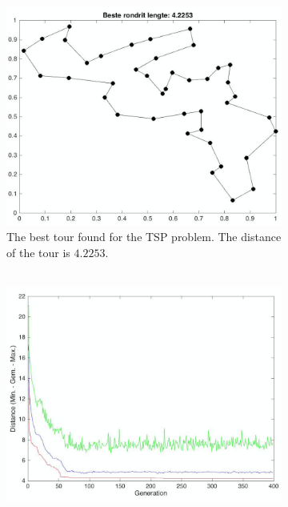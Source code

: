
\begin{figure}[!]
\centering
\begin{subfigure}{.40\textwidth}
  \centering
  \includegraphics[width=1.2\linewidth]{../figures/figures_question_4/belgium_tour_path}
  \caption{The best tour found for the TSP problem. The distance of the tour is $4.2253$.\\ \ \\}
  \label{fig:belgium_tour_4_path}
\end{subfigure}%
\hspace{0.1\textwidth}
\begin{subfigure}{.45\textwidth}
  \centering
  \includegraphics[width=1.2\linewidth]{../figures/figures_question_4/belgium_tour_gen}

\end{subfigure}
\end{figure}
